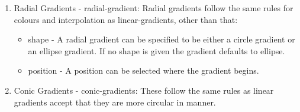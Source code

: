 \documentclass[11pt]{article}
\begin{document}
\begin{enumerate}
\begin{enumerate}
\item Radial Gradients - radial-gradient:
Radial gradients follow the same rules for colours and interpolation as linear-gradients, other than that:
\begin{itemize}
\item shape - A radial gradient can be specified to be either a circle gradient or an ellipse
gradient. If no shape is given the gradient defaults to ellipse.
\item position - A position can be selected where the gradient begins.
\end{itemize}
\item Conic Gradients - conic-gradients:
These follow the same rules as linear gradients accept that they are more circular in manner.
\end{enumerate}
\end{enumerate}
\end{document}
